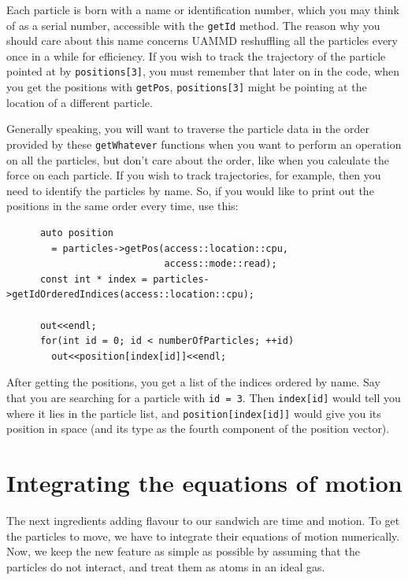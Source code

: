 Each particle is born with a name or identification number, which you may think
of as a serial number, accessible with the \texttt{getId} method. The reason why
you should care about this name concerns UAMMD reshuffling all the particles
every once in a while for efficiency. If you wish to track the trajectory of the
particle pointed at by \texttt{positions[3]}, you must remember that later on in
the code, when you get the positions with \texttt{getPos}, \texttt{positions[3]}
might be pointing at the location of a different particle.

Generally speaking, you will want to traverse the particle data in the order
provided by these \texttt{getWhatever} functions when you want to perform an
operation on all the particles, but don't care about the order, like when you
calculate the force on each particle. If you wish to track trajectories, for
example, then you need to identify the particles by name. So, if you would
like to print out the positions in the same order every time, use this:

\label{particlePositions}
\begin{lstlisting}
      auto position
        = particles->getPos(access::location::cpu,
                            access::mode::read);
      const int * index = particles->getIdOrderedIndices(access::location::cpu);

      out<<endl;
      for(int id = 0; id < numberOfParticles; ++id)
        out<<position[index[id]]<<endl;
\end{lstlisting}
After getting the positions, you get a list of the indices ordered by name. Say
that you are searching for a particle with \texttt{id = 3}. Then
\texttt{index[id]} would tell you where it lies in the particle list, and
\texttt{position[index[id]]} would give you its position in space (and its type
as the fourth component of the position vector).

\section{Integrating the equations of motion}

The next ingredients adding flavour to our sandwich are time and motion. To get
the particles to move, we have to integrate their equations of motion
numerically. Now, we keep the new feature as simple as possible by assuming that
the particles do not interact, and treat them as atoms in an ideal gas.

